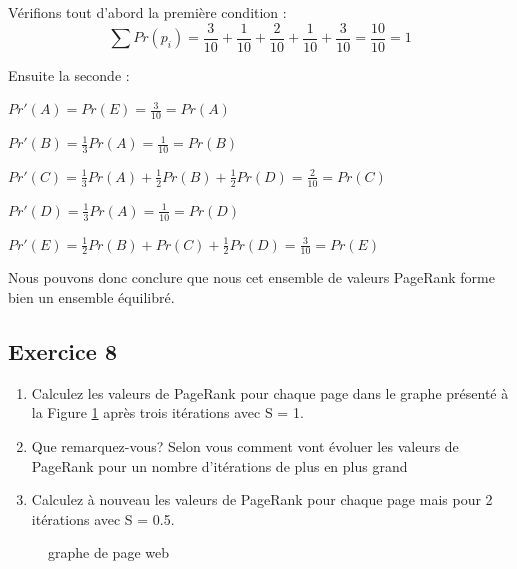     Vérifions tout d'abord la première condition :
    $$ \sum Pr(p_i) = \frac{3}{10} + \frac{1}{10} + \frac{2}{10}  + \frac{1}{10}+  \frac{3}{10} = \frac{10}{10} = 1 $$

    Ensuite la seconde :
    \begin{description}
        \item $Pr'(A) = Pr(E) = \frac{3}{10} = Pr(A)$
        \item $Pr'(B) = \frac{1}{3} Pr(A) = \frac{1}{10} = Pr(B)$
        \item $Pr'(C) = \frac{1}{3} Pr(A) + \frac{1}{2} Pr(B) + \frac{1}{2} Pr(D) = \frac{2}{10} = Pr(C)$
        \item $Pr'(D) = \frac{1}{3} Pr(A) = \frac{1}{10} = Pr(D)$
        \item $Pr'(E) = \frac{1}{2} Pr(B) + Pr(C) + \frac{1}{2} Pr(D) = \frac{3}{10} = Pr(E)$\\
    \end{description}

    Nous pouvons donc conclure que nous cet ensemble de valeurs PageRank forme bien un ensemble équilibré.
    

\subsection*{Exercice 8}
		\begin{enumerate}
				\item Calculez les valeurs de PageRank pour chaque page dans le graphe présenté à la Figure \ref{fig:blackhole} après trois itérations avec S = 1.
				\item Que remarquez-vous? Selon vous comment vont évoluer les valeurs
						de PageRank pour un nombre d'itérations de plus en plus grand
				\item Calculez à nouveau les valeurs de PageRank pour chaque page mais pour 2 itérations avec S = 0.5.
		\end{enumerate}
		
    \begin{figure}[ht!]
	\centering
	
\caption{graphe de page web}
\label{fig:blackhole}
\end{figure}
		
